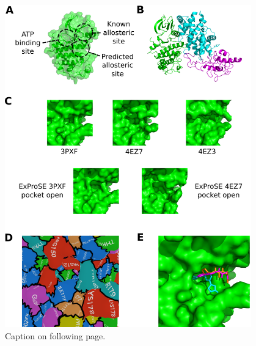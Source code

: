\begin{figure}
\centering

\includegraphics[width=0.95\textwidth]{figures/cdk2_structure/cdk2_structure}

\caption[Conformational variability and virtual screening of CDK2]
{Caption on following page.}

\label{fig:cdk2_structure}
\end{figure}

